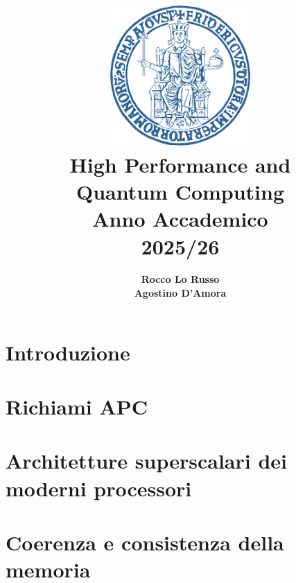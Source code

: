 \documentclass[a4paper,12pt, openany]{extbook}
\title{
    \includegraphics[width=0.4\textwidth]{fig/logo_unina.png} \\ %
    \vspace{1cm}
    \Huge{High Performance and\\Quantum Computing} \\
    \vspace{0.5cm} 
    \Large{Anno Accademico\\2025/26}
}
\author{\textbf{Rocco Lo Russo}\\\textbf{Agostino D'Amora}} %
\date{}
\begin{document}
\maketitle

\tableofcontents
\newpage

\chapter*{Introduzione}


\chapter{Richiami APC} \label{chap:richiami_apc}





\chapter{Architetture superscalari dei moderni processori} \label{chap:architetture_superscalari}






\chapter{Coerenza e consistenza della memoria}
\end{document}
